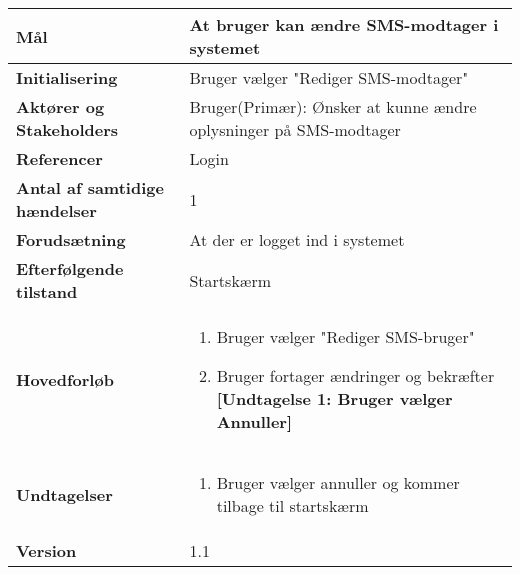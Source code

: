 \begin{table}[H] \centering
\begin{tabular}{|p{6cm}|p{8cm}|}
	\hline
\textbf{Mål} &
At bruger kan ændre SMS-modtager i systemet\\\hline

\textbf{Initialisering} &
  Bruger vælger "Rediger SMS-modtager"\\\hline
 
\textbf{Aktører og Stakeholders} &
Bruger(Primær): Ønsker at kunne ændre oplysninger på SMS-modtager  \\\hline

\textbf{Referencer} &
Login  \\\hline

\textbf{Antal af samtidige hændelser} &
1  \\\hline

\textbf{Forudsætning} &
At der er logget ind i systemet  \\\hline

\textbf{Efterfølgende tilstand} &
Startskærm  \\\hline

\textbf{Hovedforløb} &
\begin{enumerate}

\item Bruger vælger "Rediger SMS-bruger"
\item Bruger fortager ændringer og bekræfter \newline
\textbf{[Undtagelse 1: Bruger vælger Annuller]}

\end{enumerate}   
 \\\hline
 
\textbf{Undtagelser}
&\begin{enumerate}[label= \ref{UC8und1}a.]
\item Bruger vælger annuller og kommer tilbage til startskærm
\end{enumerate}
 \\\hline
 
		\textbf{Version}		&1.1 \\\hline
	\end{tabular}
	\label{UC6} 
\end{table}